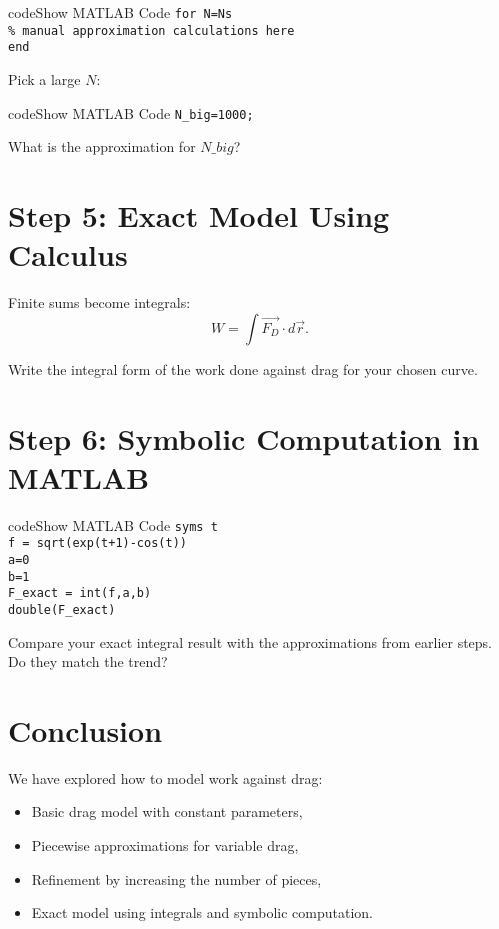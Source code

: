 \documentclass{ximera}
\begin{document}
\begin{expandable}{code}{Show MATLAB Code}
\texttt{for N=Ns}\\
\quad \texttt{\% manual approximation calculations here}\\
\texttt{end}
\end{expandable}

Pick a large $N$:

\begin{expandable}{code}{Show MATLAB Code}
\texttt{N\_big=1000;}
\end{expandable}

\begin{problem}
What is the approximation for $N\_big$?
\end{problem}

\section*{Step 5: Exact Model Using Calculus}

Finite sums become integrals:
\[
W = \int \vec{F_D}\cdot d\vec{r}.
\]

\begin{problem}
Write the integral form of the work done against drag for your chosen curve.
\end{problem}

\section*{Step 6: Symbolic Computation in MATLAB}

\begin{expandable}{code}{Show MATLAB Code}
\texttt{syms t}\\
\texttt{f = sqrt(exp(t+1)-cos(t))}\\
\texttt{a=0}\\
\texttt{b=1}\\
\texttt{F\_exact = int(f,a,b)}\\
\texttt{double(F\_exact)}
\end{expandable}

\begin{problem}
Compare your exact integral result with the approximations from earlier steps. Do they match the trend?
\end{problem}

\section*{Conclusion}

We have explored how to model work against drag:
\begin{itemize}
\item Basic drag model with constant parameters,
\item Piecewise approximations for variable drag,
\item Refinement by increasing the number of pieces,
\item Exact model using integrals and symbolic computation.
\end{itemize}
\end{document}
